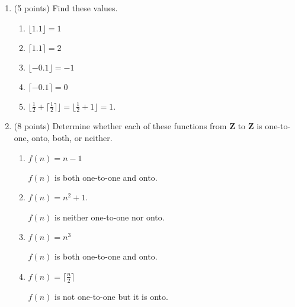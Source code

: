\documentclass[11pt]{article}
\begin{document}
\begin{enumerate}
\begin{enumerate}
\begin{proof}
\begin{center}
\begin{tabular} { |c|c|c|c|c|c|c|c| }
\hline
$A$ & $B$ & $C$ & $B-A$ & $C-A$ & $(B-A) \cup (C-A)$ & $B \cup C$ & $(B \cup C)-A$ \\
\hline
$0$ & $0$ & $0$ & $0$ & $0$ & $0$ & $0$ & $0$ \\
$0$ & $0$ & $1$ & $0$ & $1$ & $1$ & $1$ & $1$ \\
$0$ & $1$ & $0$ & $1$ & $0$ & $1$ & $1$ & $1$ \\
$0$ & $1$ & $1$ & $1$ & $1$ & $1$ & $1$ & $1$ \\
$1$ & $0$ & $0$ & $0$ & $0$ & $0$ & $0$ & $0$ \\
$1$ & $0$ & $1$ & $0$ & $0$ & $0$ & $1$ & $0$ \\
$1$ & $1$ & $0$ & $0$ & $0$ & $0$ & $1$ & $0$ \\
$1$ & $1$ & $1$ & $0$ & $0$ & $0$ & $1$ & $0$ \\
\hline
\end{tabular}
\end{center}

Because the columns for $(B-A)\cup(C-A)$ is indentical to the column for $(B\cup C)-A$, we have proven that $(B-A)\cup(C-A)=(B\cup C)-A$.  
\end{proof}

\end{enumerate}

\item (5 points) Find these values.
\begin{enumerate}
\item $\lfloor 1.1\rfloor = 1$
\item $\lceil 1.1\rceil = 2$
\item $\lfloor -0.1\rfloor = -1$
\item $\lceil -0.1\rceil = 0$
\item $\lfloor \frac{1}{2}+\lceil \frac{1}{2}\rceil\rfloor = \lfloor \frac{1}{2} + 1 \rfloor = 1$.  
\end{enumerate}

\item (8 points) 
Determine whether each of these functions from {\bf Z} to {\bf Z} is one-to-one, onto, both, or neither.
\begin{enumerate}
\item $f(n)=n-1$

$f(n)$ is both one-to-one and onto.  

\item $f(n)=n^2+1$.

$f(n)$ is neither one-to-one nor onto.  

\item $f(n)=n^3$

$f(n)$ is both one-to-one and onto.  

\item $f(n)=\lceil\frac{n}{2}\rceil$

$f(n)$ is not one-to-one but it is onto.  

\end{enumerate}

\end{enumerate}
\end{document}
